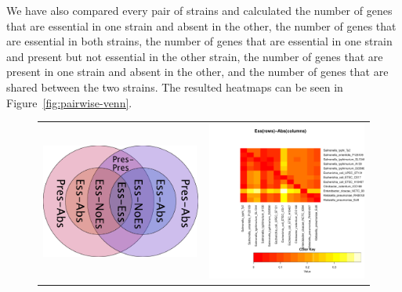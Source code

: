 \documentclass[a4paper,10pt, twocolumn]{article}
\begin{document}
We have also compared every pair of strains and calculated the number of genes that are essential in one strain and absent in the other, the number of genes that are essential in both strains, the number of genes that are essential in one strain and present but not essential in the other strain, the number of genes that are present in one strain and absent in the other, and the number of genes that are shared between the two strains. The resulted heatmaps can be seen in Figure~\ref{fig:pairwise-venn}. 

\begin{figure}
\centering
\begin{tabular}{c c}
\includegraphics[scale=0.35]{venn/venn.pdf}&
\includegraphics[page=5, scale=0.34]{essentiality-heatmap.pdf} \\ 

\end{tabular}
\end{figure}
\end{document}
